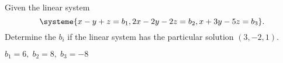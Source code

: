 

\begin{Exercise}[
name={},
title={}, 
difficulty=0,
origin={\cite{YL}}]
Given the linear system
\[\systeme{x-y+z=b_1,2x-2y-2z=b_2,x +3y-5z=b_3}.\]  Determine the $b_i$ if the linear system has the particular solution $(3,-2, 1)$.
\end{Exercise}

\begin{Answer}
$b_1=6,\;b_2=8,\;b_3=-8$
\end{Answer}
